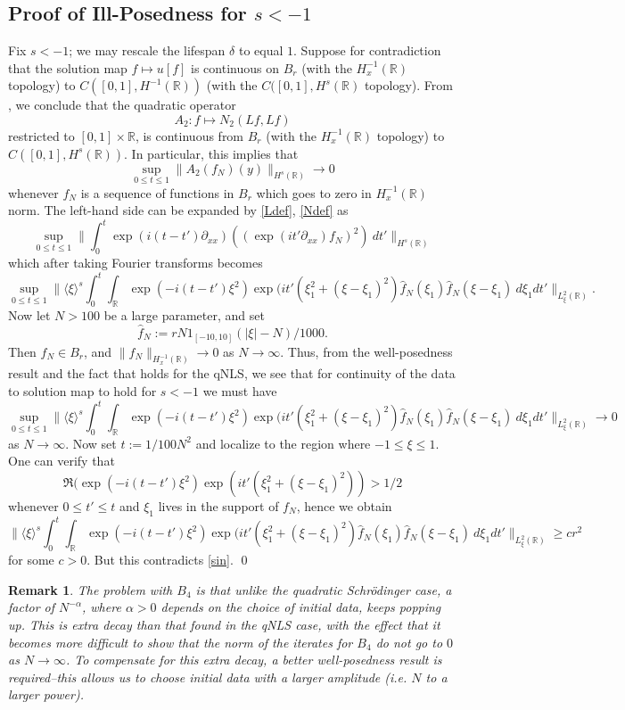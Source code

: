 \documentclass[12pt,reqno]{amsart}
\numberwithin{equation}{section}  %
\renewcommand{\cref}{\Cref}
\newcommand{\rr}{\mathbb{R}}
\newtheorem{remark}[theorem]{Remark}
\newcommand{\R}{\mathbb{R}}
\begin{document}
\subsection{Proof of Ill-Posedness for $s < -1$} 
%
%
%
Fix $s < -1$; we may rescale the lifespan $\delta$ to equal $1$.  Suppose for contradiction
that the solution map $f \mapsto u[f]$ is continuous on $B_r$ (with the
$H^{-1}_x(\R)$ topology) to $C([0, 1], H^{-1}(\rr))$ 
(with the $C([0,1], H^{s}(\rr)$ topology). From 
\cref{lem:qnls-asymp}, we conclude that the quadratic operator
$$ A_2: f \mapsto N_2(Lf, Lf)$$ 
restricted to $[0,1] \times \R$, is continuous from $B_r$ (with the $H^{-1}_x(\R)$ topology) 
to $C([0,1], H^{s}(\rr))$.  In particular, this implies that
$$ \sup_{0 \leq t\leq 1}\| A_2(f_N)(y) \|_{H^{s}(\R)} \to 0$$
whenever $f_N$ is a sequence of functions in $B_r$ which goes to zero in $H^{-1}_x(\R)$ norm.
The left-hand side can be expanded by \eqref{Ldef}, \eqref{Ndef} as
$$ \sup_{0 \leq t \leq 1} 
\| \int_0^t \exp(i(t-t')\partial_{xx})((\exp(it' \partial_{xx}) f_N)^2)\ dt' \|_{H^{s}(\R)}$$
which after taking Fourier transforms becomes
$$\sup_{0 \leq t \leq 1} 
\| \langle \xi \rangle^{s}
\int_0^t \int_\R \exp(-i(t-t')\xi^2) \exp(it' (\xi_1^2 + (\xi-\xi_1)^2) \hat f_N(\xi_1) \hat f_N(\xi-\xi_1)\ d\xi_1 dt'
\|_{L^2_\xi(\R)}.$$
Now let $N > 100$ be a large parameter, and set 
$$ \hat f_N := r N 1_{[-10,10]}(|\xi|-N) / 1000.$$
Then $f_N \in B_r$, and $\|f_N\|_{H^{-1}_x(\R)} \to 0$ as $N \to \infty$.  Thus,
from the well-posedness result \cref{lwp} and the fact that
\cref{lem:qnls-asymp}
holds for
the qNLS, we see that for continuity of the data to solution map to hold for $s < -1$ we must have
\begin{equation}\label{sin}
\sup_{0 \leq t \leq 1} \| \langle \xi \rangle^{s}
\int_0^t \int_\R \exp(-i(t-t')\xi^2) \exp(it' (\xi_1^2 + (\xi-\xi_1)^2) \hat f_N(\xi_1) \hat f_N(\xi-\xi_1)\ d\xi_1 dt'
\|_{L^2_\xi(\R)} \to 0
\end{equation}
as $N \to \infty$.
Now set $t := 1/100N^2$ and localize to the region where $-1 \leq \xi \leq 1$.  One can verify that
$$ \Re( \exp(-i(t-t')\xi^2) \exp(it' (\xi_1^2 + (\xi-\xi_1)^2) ) > 1/2$$
whenever $0 \leq t' \leq t$ and $\xi_1$ lives in the support of $f_{N}$, hence we obtain
$$ 
\| \langle \xi \rangle^{s}
\int_0^t \int_\R \exp(-i(t-t')\xi^2) \exp(it' (\xi_1^2 + (\xi-\xi_1)^2) \hat f_N(\xi_1) \hat f_N(\xi-\xi_1)\ d\xi_1 dt'
\|_{L^2_\xi(\R)} \geq c r^2$$
for some $c > 0$.  But this contradicts \eqref{sin}. \qed
%
%
%
\begin{framed}
%
%
\begin{remark}
  The problem with $B_{4}$ is that unlike the quadratic
  Schr{\"o}dinger case, a factor of $N^{-\alpha}$, where $\alpha > 0 $ depends on
  the choice of initial data, keeps popping up. This is extra decay than that
  found in the qNLS case, with the effect that it becomes more
  difficult to show that the norm of the iterates for $B_{4}$ do not go to $0$ as $N
  \to \infty$. To compensate for this extra decay, a better well-posedness
  result is required--this allows us to choose initial data with a larger
  amplitude (i.e. $N$ to a larger power). 
\end{remark}
%
%
\end{framed}
\end{document}
